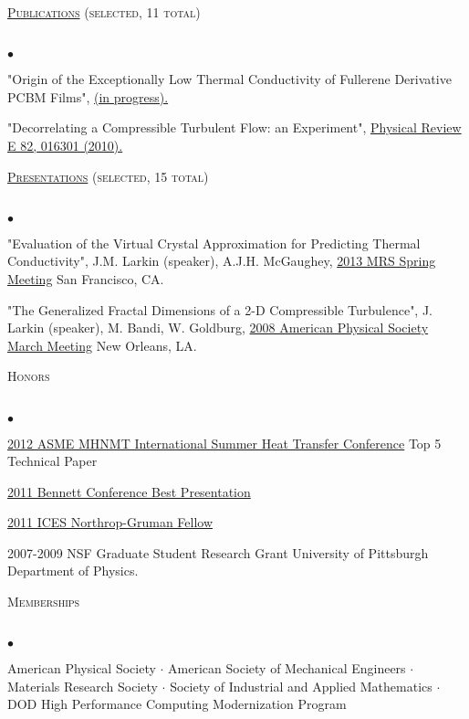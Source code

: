 \documentclass{article}
\newcommand{\lineunder}{\vspace*{-8pt} \\ \hspace*{-18pt} \hrulefill \\}
\newcommand{\header}[1]{{\hspace*{-15pt}\vspace*{6pt} \textsc{#1}} \vspace*{-6pt} \lineunder}
\newenvironment{achievements}{\begin{list}{$\bullet$}{\topsep 0pt \itemsep -2pt}}{\vspace*{4pt}\end{list}}
\begin{document}
\header{\href{http://jasonlarkin.github.io/pub.html}{Publications} (selected, 11 total)}
\begin{achievements}
\item "Origin of the Exceptionally Low Thermal Conductivity of Fullerene Derivative  PCBM Films", 
\href{http://jasonlarkin.github.io/projects-phd-pcbm.html}{(in progress).}
\item "Decorrelating a Compressible Turbulent Flow: an Experiment", \href{http://pre.aps.org/abstract/PRE/v82/i1/e016301}{Physical Review E 82, 016301 (2010).}
\end{achievements}

\header{\href{http://jasonlarkin.github.io/pres.html}{Presentations} (selected, 15 total)}
\begin{achievements}
\item "Evaluation of the Virtual Crystal Approximation for Predicting Thermal Conductivity", J.M. Larkin (speaker), A.J.H.
   McGaughey, \href{http://www.mrs.org/spring2013/}{2013 MRS Spring Meeting} San Francisco, CA.
\item "The Generalized Fractal Dimensions of a 2-D Compressible Turbulence", J. Larkin (speaker), M. Bandi, W. Goldburg, \href{http://meetings.aps.org/Meeting/MAR08/Content/1017}{2008 American Physical Society March Meeting} New Orleans, LA.
\end{achievements}


\header{Honors}
\begin{achievements}
\item \href{http://www.asmeconferences.org/HT2012/}{2012 ASME MHNMT International Summer Heat Transfer Conference} Top 5 Technical Paper
\item \href{http://www.cmu.edu/me/news/archive/2011/bennett-conference.html}{2011 Bennett Conference Best Presentation}
\item \href{http://www.ices.cmu.edu/newsitem.asp?NewsID=749}{2011 ICES Northrop-Gruman Fellow}
\item 2007-2009 NSF Graduate Student Research Grant University of Pittsburgh Department of Physics.
\end{achievements}

\header{Memberships}
\begin{achievements}
\item American Physical Society $\cdot$ American Society of Mechanical Engineers 
$\cdot$ Materials Research Society $\cdot$ Society of Industrial and Applied Mathematics $\cdot$ DOD High Performance Computing Modernization Program
\end{achievements}
\end{document}
